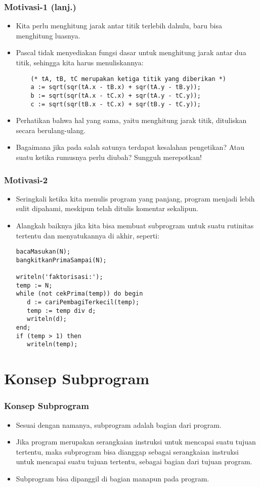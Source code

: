 \documentclass{beamer}
\begin{document}
\begin{frame}[fragile]
\frametitle{Motivasi-1 (lanj.)}
\begin{itemize}
    \item Kita perlu menghitung jarak antar titik terlebih dahulu, baru bisa menghitung luasnya.
    \item Pascal tidak menyediakan fungsi dasar untuk menghitung jarak antar dua titik, sehingga kita harus menuliskannya:
    \begin{lstlisting}
    (* tA, tB, tC merupakan ketiga titik yang diberikan *)
    a := sqrt(sqr(tA.x - tB.x) + sqr(tA.y - tB.y));
    b := sqrt(sqr(tA.x - tC.x) + sqr(tA.y - tC.y));
    c := sqrt(sqr(tB.x - tC.x) + sqr(tB.y - tC.y));
    \end{lstlisting}
    \item Perhatikan bahwa hal yang sama, yaitu menghitung jarak titik, dituliskan secara berulang-ulang.
    \item Bagaimana jika pada salah satunya terdapat kesalahan pengetikan? Atau suatu ketika rumusnya perlu diubah? Sungguh merepotkan!
\end{itemize}
\end{frame}

\begin{frame}[fragile]
\frametitle{Motivasi-2}
\begin{itemize}
    \item Seringkali ketika kita menulis program yang panjang, program menjadi lebih sulit dipahami, meskipun telah ditulis komentar sekalipun.
    \item Alangkah baiknya jika kita bisa membuat subprogram untuk suatu rutinitas tertentu dan menyatukannya di akhir, seperti:
    \begin{lstlisting}
bacaMasukan(N);
bangkitkanPrimaSampai(N);

writeln('faktorisasi:');
temp := N;
while (not cekPrima(temp)) do begin
   d := cariPembagiTerkecil(temp);
   temp := temp div d;
   writeln(d);
end;
if (temp > 1) then
   writeln(temp);
    \end{lstlisting}
\end{itemize}
\end{frame}

\section{Konsep Subprogram}
\frame{\sectionpage}

\begin{frame}
\frametitle{Konsep Subprogram}
\begin{itemize}
    \item Sesuai dengan namanya, subprogram adalah bagian dari program.
    \item Jika program merupakan serangkaian instruksi untuk mencapai suatu tujuan tertentu, maka subprogram bisa dianggap sebagai serangkaian instruksi untuk mencapai suatu tujuan tertentu, \alert{sebagai bagian dari tujuan program}.
    \item Subprogram bisa dipanggil di bagian manapun pada program.
\end{itemize}
\end{frame}
\end{document}
